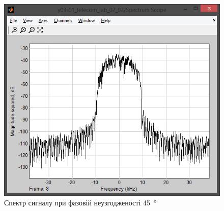 \documentclass[
	a4paper,
	oneside,
	BCOR = 10mm,
	DIV = 12,
	12pt,
	headings = normal,
]{scrartcl}
\begin{document}
\begin{figure}[!htbp]
\begin{minipage}[t]{0.5\textwidth - 0.5em}
						\includegraphics[height = 8\baselineskip]{../01-solution/00-SNR-100db-noshift-modulator-spectrum.png}
						\caption{Спектр сигналу при фазовій неузгодженості \SI{45}{\degree}}
						\label{fig:phaseshift-scope}
					\end{minipage}%
				\end{figure}
\end{document}
